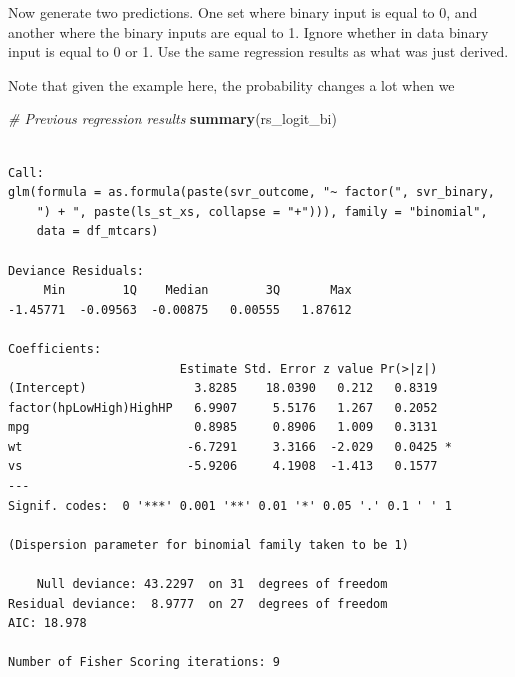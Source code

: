 \documentclass[
]{book}
\newenvironment{Shaded}{\begin{snugshade}}{\end{snugshade}}
\newcommand{\CommentTok}[1]{\textcolor[rgb]{0.56,0.35,0.01}{\textit{#1}}}
\newcommand{\KeywordTok}[1]{\textcolor[rgb]{0.13,0.29,0.53}{\textbf{#1}}}
\newcommand{\NormalTok}[1]{#1}
\begin{document}
Now generate two predictions. One set where binary input is equal to 0, and another where the binary inputs are equal to 1. Ignore whether in data binary input is equal to 0 or 1. Use the same regression results as what was just derived.

Note that given the example here, the probability changes a lot when we

\begin{Shaded}
\begin{Highlighting}[]
\CommentTok{# Previous regression results}
\KeywordTok{summary}\NormalTok{(rs_logit_bi)}
\end{Highlighting}
\end{Shaded}

\begin{verbatim}

Call:
glm(formula = as.formula(paste(svr_outcome, "~ factor(", svr_binary, 
    ") + ", paste(ls_st_xs, collapse = "+"))), family = "binomial", 
    data = df_mtcars)

Deviance Residuals: 
     Min        1Q    Median        3Q       Max  
-1.45771  -0.09563  -0.00875   0.00555   1.87612  

Coefficients:
                        Estimate Std. Error z value Pr(>|z|)  
(Intercept)               3.8285    18.0390   0.212   0.8319  
factor(hpLowHigh)HighHP   6.9907     5.5176   1.267   0.2052  
mpg                       0.8985     0.8906   1.009   0.3131  
wt                       -6.7291     3.3166  -2.029   0.0425 *
vs                       -5.9206     4.1908  -1.413   0.1577  
---
Signif. codes:  0 '***' 0.001 '**' 0.01 '*' 0.05 '.' 0.1 ' ' 1

(Dispersion parameter for binomial family taken to be 1)

    Null deviance: 43.2297  on 31  degrees of freedom
Residual deviance:  8.9777  on 27  degrees of freedom
AIC: 18.978

Number of Fisher Scoring iterations: 9
\end{verbatim}
\end{document}
